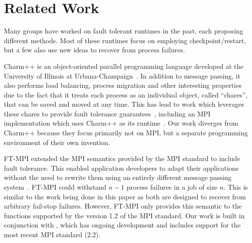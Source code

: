 \section{Related Work} \label{sect:related}

Many groups have worked on fault tolerant runtimes in the past, each
proposing different methods. Most of these runtimes focus on
employing checkpoint/restart, but a few also use new ideas to recover
from process failures.


Charm++ is an object-oriented parallel programming language developed at the
University of Illinois at Urbana-Champaign~\cite{Kale93charm++}. In addition to
message passing, it also performs load balancing, process migration and other
interesting properties due to the fact that it treats each process as an
individual object, called ``chares'', that can be saved and moved at any time.
This has lead to work which leverages these chares to provide fault tolerance
guarantees~\cite{ZhengFTC}, including an MPI implementation which uses Charm++
as its runtime~\cite{ampiJournal}. Our work diverges from Charm++ because they
focus primarily not on MPI, but a separate programming environment of their own
invention.


FT-MPI extended the MPI semantics provided by the MPI standard to include fault
tolerance. This enabled application developers to adapt their applications
without the need to rewrite them using an entirely different message passing
system~\cite{fagg2000ft}. FT-MPI could withstand $n-1$ process failures in a job
of size $n$. This is similar to the work being done in this paper as both are
designed to recover from arbitrary fail-stop failures. However, FT-MPI only
provides this semantic to the functions supported by the version 1.2 of the MPI
standard. Our work is built in conjunction with \ompi, which has ongoing
development and includes support for the most recent MPI standard (2.2).



